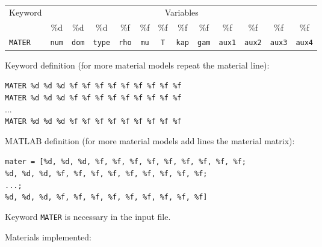 \begin{tabular}{|l|c|c|c|c|c|c|c|c|c|c|c|c|}
\hline
\multirow{2}{*}{Keyword} & \multicolumn{12}{c|}{Variables} \\ \cline{2-13}
& \%d & \%d & \%d & \%f & \%f & \%f & \%f & \%f & \%f & \%f & \%f & \%f \\ \hline
\texttt{MATER} & \texttt{num} & \texttt{dom} & \texttt{type} & \texttt{rho} & \texttt{mu} & \texttt{T} & \texttt{kap} & \texttt{gam} & \texttt{aux1} & \texttt{aux2} & \texttt{aux3} & \texttt{aux4} \\ \hline
\end{tabular}

Keyword definition (for more material models repeat the material line):

\begin{tcolorbox}
\texttt{MATER \%d \%d \%d \%f \%f \%f \%f \%f \%f \%f \%f \%f} \\
\texttt{MATER \%d \%d \%d \%f \%f \%f \%f \%f \%f \%f \%f \%f} \\
... \\
\texttt{MATER \%d \%d \%d \%f \%f \%f \%f \%f \%f \%f \%f \%f}
\end{tcolorbox}

MATLAB definition (for more material models add lines the material matrix):

\begin{tcolorbox}
\texttt{mater = [\%d, \%d, \%d, \%f, \%f, \%f, \%f, \%f, \%f, \%f, \%f, \%f; \\
\%d, \%d, \%d, \%f, \%f, \%f, \%f, \%f, \%f, \%f, \%f, \%f; \\
...; \\
\%d, \%d, \%d, \%f, \%f, \%f, \%f, \%f, \%f, \%f, \%f, \%f]}
\end{tcolorbox}

Keyword \texttt{MATER} is necessary in the input file.

Materials implemented:


